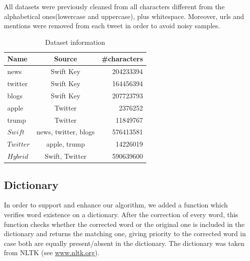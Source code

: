 \documentclass[12pt]{article}
\begin{document}
All datasets were previously cleaned from all characters
different from the alphabetical ones(lowercase and uppercase), plus whitespace.
Moreover, urls and mentions were removed from each tweet in order to avoid
noisy samples.

\begin{table}[htbp]
  \centering
  \setlength{\tabcolsep}{0.4em}
  \renewcommand{\arraystretch}{1.2}
    \begin{tabular}{lcr}
    \toprule
    \textbf{Name}  & \textbf{Source} & \textbf{\#characters} \\
    \midrule
    news  & Swift Key  & 204233394 \\
    twitter & Swift Key  & 164456394 \\
    blogs & Swift Key  & 207723793 \\
    apple & Twitter & 2376252 \\
    trump & Twitter & 11849767 \\
    \bottomrule
    $Swift$ & news, twitter, blogs & 576413581 \\
    $Twitter$ & apple, trump & 14226019 \\
    $Hybrid$ & Swift, Twitter & 590639600 \\
    \bottomrule
    \end{tabular}%
    \caption{Dataset information}
  \label{tab:dataset}%
\end{table}%

\subsection{Dictionary}\label{dict}
In order to support and enhance our algorithm, we added a
function which verifies word existence on a dictionary. After the correction of
every word, this function checks whether the corrected word or the original one is included in
the dictionary and returns the matching one, giving priority to the corrected
word in case both are equally present/absent in the dictionary. The dictionary was taken
from NLTK (see \url{www.nltk.org}).

\newpage
\end{document}
